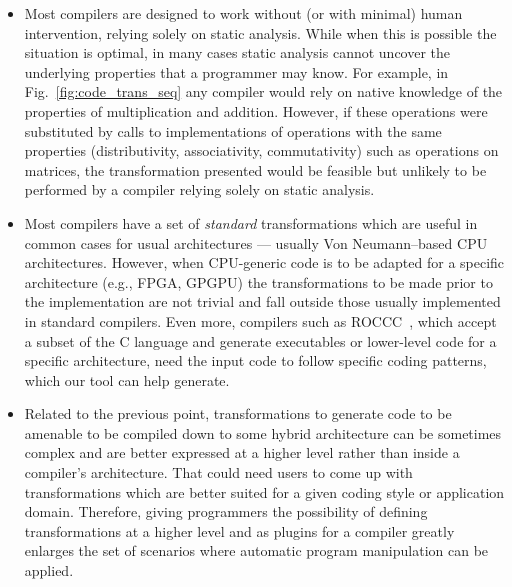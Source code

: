 \documentclass[svgnames,usenames,preprint,nocopyrightspace]{sigplanconf}
\begin{document}
\begin{itemize}
\item Most compilers are designed to work without (or with minimal)
  human intervention, relying solely on static analysis.  While when
  this is possible the situation is optimal, in many cases static
  analysis cannot uncover the underlying properties that a programmer
  may know.  For example, in Fig.~\ref{fig:code_trans_seq} any
  compiler would rely on native knowledge of the properties of
  multiplication and addition.  However, if these operations were
  substituted by calls to implementations of operations with the same
  properties (distributivity, associativity, commutativity) such as
  operations on matrices, the transformation presented would be
  feasible but unlikely to be performed by a compiler relying solely
  on static analysis.

\item Most compilers have a set of \emph{standard} transformations
  which are useful in common cases for usual architectures --- usually
  Von Neumann--based CPU architectures.  However, when CPU-generic
  code is to be adapted for a specific architecture (e.g., FPGA,
  GPGPU) the transformations to be made prior to the implementation
  are not trivial and fall outside those usually implemented in
  standard compilers.  Even more, compilers such as
  ROCCC~\cite{roccc-manual}, which accept a subset of the C language
  and generate executables or lower-level code for a specific
  architecture, need the input code to follow specific coding
  patterns, which our tool can help generate.

\item Related to the previous point, transformations to generate code
  to be amenable to be compiled down to some hybrid architecture can
  be sometimes complex and are better expressed at a higher level
  rather than inside a compiler's architecture.  That could need users
  to come up with transformations which are better suited for a given
  coding style or application domain.  Therefore, giving programmers
  the possibility of defining transformations at a higher level and as
  plugins for a compiler greatly enlarges the set of scenarios where
  automatic program manipulation can be applied.
\end{itemize}
\end{document}
